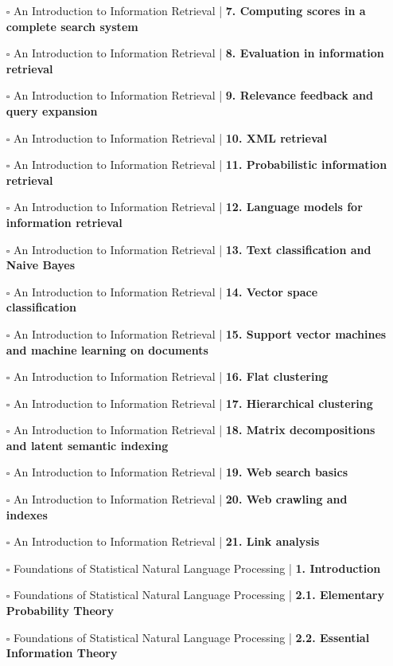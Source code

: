 \documentclass[a4, landscape, 12pt]{article}
\newcommand{\checkbox}{$\square$}%
\begin{document}
\begin{itemize}
{}
\item [\checkbox]  An Introduction to Information Retrieval | \textbf{ 7. Computing scores in a complete search system
}
\item [\checkbox]  An Introduction to Information Retrieval | \textbf{ 8. Evaluation in information retrieval
}
\item [\checkbox]  An Introduction to Information Retrieval | \textbf{ 9. Relevance feedback and query expansion
}
\item [\checkbox]  An Introduction to Information Retrieval | \textbf{ 10. XML retrieval
}
\item [\checkbox]  An Introduction to Information Retrieval | \textbf{ 11. Probabilistic information retrieval
}
\item [\checkbox]  An Introduction to Information Retrieval | \textbf{ 12. Language models for information retrieval
}
\item [\checkbox]  An Introduction to Information Retrieval | \textbf{ 13. Text classification and Naive Bayes
}
\item [\checkbox]  An Introduction to Information Retrieval | \textbf{ 14. Vector space classification
}
\item [\checkbox]  An Introduction to Information Retrieval | \textbf{ 15. Support vector machines and machine learning on documents
}
\item [\checkbox]  An Introduction to Information Retrieval | \textbf{ 16. Flat clustering
}
\item [\checkbox]  An Introduction to Information Retrieval | \textbf{ 17. Hierarchical clustering
}
\item [\checkbox]  An Introduction to Information Retrieval | \textbf{ 18. Matrix decompositions and latent semantic indexing
}
\item [\checkbox]  An Introduction to Information Retrieval | \textbf{ 19. Web search basics
}
\item [\checkbox]  An Introduction to Information Retrieval | \textbf{ 20. Web crawling and indexes
}
\item [\checkbox]  An Introduction to Information Retrieval | \textbf{ 21. Link analysis
}
\item [\checkbox]  Foundations of Statistical Natural Language Processing | \textbf{ 1. Introduction
}
\item [\checkbox]  Foundations of Statistical Natural Language Processing | \textbf{ 2.1. Elementary Probability Theory
}
\item [\checkbox]  Foundations of Statistical Natural Language Processing | \textbf{ 2.2. Essential Information Theory
}
\end{itemize}
\end{document}
